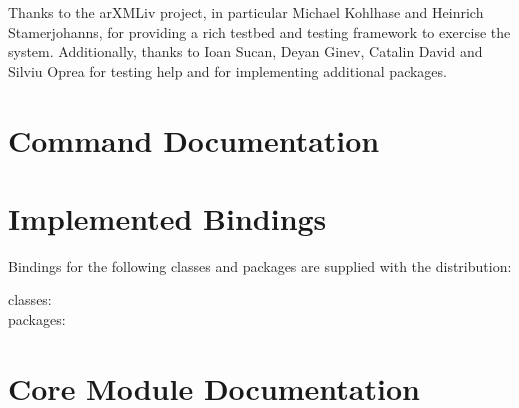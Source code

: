 \documentclass{book}
\begin{document}
Thanks to the arXMLiv project, in particular Michael Kohlhase and Heinrich Stamerjohanns,
for providing a rich testbed and testing framework to exercise the system.
Additionally, thanks to Ioan Sucan, Deyan Ginev,
Catalin David and Silviu Oprea for testing help and for implementing additional packages.

\appendix
\chapter[Commands]{Command Documentation}\label{commands}




\chapter[Bindings]{Implemented Bindings}\label{included.bindings}
Bindings for the following classes and packages are supplied with the distribution:
\begin{description}
\item[classes:] \CurrentClasses
\item[packages:] \CurrentPackages
\end{description}

\chapter[Modules]{Core Module Documentation}\label{coremodules}





















\end{document}
